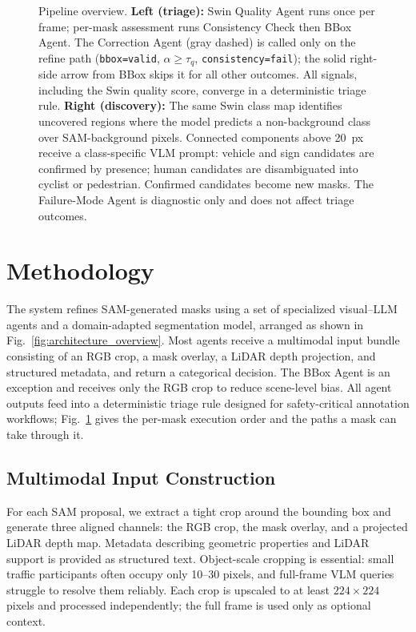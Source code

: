 \documentclass[conference]{IEEEtran}
\begin{document}
\begin{figure}[t]
    \centering
    
    \caption{Pipeline overview. \textbf{Left (triage):} Swin Quality Agent runs once per frame; per-mask assessment runs Consistency Check then BBox Agent. The Correction Agent (gray dashed) is called only on the refine path (\texttt{bbox=valid}, $\alpha{\geq}\tau_q$, \texttt{consistency=fail}); the solid right-side arrow from BBox skips it for all other outcomes. All signals, including the Swin quality score, converge in a deterministic triage rule. \textbf{Right (discovery):} The same Swin class map identifies uncovered regions where the model predicts a non-background class over SAM-background pixels. Connected components above 20~px receive a class-specific VLM prompt: vehicle and sign candidates are confirmed by presence; human candidates are disambiguated into cyclist or pedestrian. Confirmed candidates become new masks. The Failure-Mode Agent is diagnostic only and does not affect triage outcomes.}
    \label{fig:pipeline_end_to_end}
\end{figure}
\section{Methodology}
\label{sec:methodology}

The system refines SAM-generated masks using a set of specialized visual--LLM agents and a domain-adapted segmentation model, arranged as shown in Fig.~\ref{fig:architecture_overview}.
Most agents receive a multimodal input bundle consisting of an RGB crop, a mask overlay, a LiDAR depth projection, and structured metadata, and return a categorical decision.
The BBox Agent is an exception and receives only the RGB crop to reduce scene-level bias.
All agent outputs feed into a deterministic triage rule designed for safety-critical annotation workflows; Fig.~\ref{fig:pipeline_end_to_end} gives the per-mask execution order and the paths a mask can take through it.

\subsection{Multimodal Input Construction}

For each SAM proposal, we extract a tight crop around the bounding box and generate three aligned channels: the RGB crop, the mask overlay, and a projected LiDAR depth map. 
Metadata describing geometric properties and LiDAR support is provided as structured text. 
Object-scale cropping is essential: small traffic participants often occupy only 10--30 pixels, and full-frame VLM queries struggle to resolve them reliably. 
Each crop is upscaled to at least $224{\times}224$ pixels and processed independently; the full frame is used only as optional context.
\end{document}
